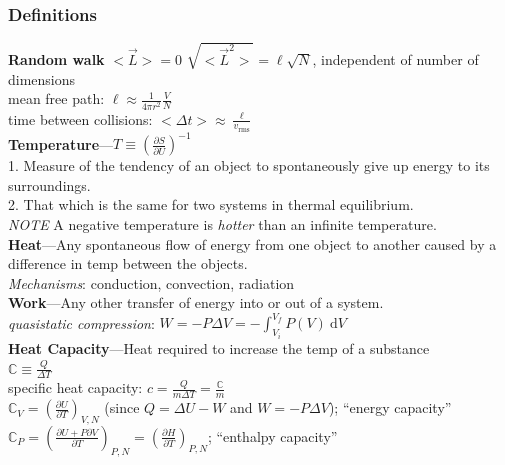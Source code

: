 \documentclass[letterpaper,landscape,10pt]{article}
\begin{document}
{\begin{multicols}{4}
  \subsubsection*{Definitions}
  \textbf{Random walk} $<\vec{L}>=0$ $\sqrt{<\vec{L}^2>}=\ell\sqrt{N}$, independent of number of dimensions \\
  mean free path: $\ell\approx \frac{1}{4\pi r^2}\frac{V}{N}$ \\
  time between collisions: $<\Delta t>\approx \frac{\ell}{v_{\textrm{rms}}}$ \\
    \textbf{Temperature}---$T\equiv \left( \frac{\partial S}{\partial U} \right)^{-1}$\\
    1. Measure of the tendency of an object to spontaneously give up energy to
      its surroundings. \\
    2. That which is the same for two systems in thermal equilibrium. \\
    \emph{NOTE} A negative temperature is \emph{hotter} than an infinite
    temperature. \\
	\vspace{2.5pt}
  \textbf{Heat}---Any spontaneous flow of energy from one object to another
    caused by a difference in temp between the objects. \\
	\emph{Mechanisms}: conduction, convection, radiation \\
	\vspace{2.5pt}
  \textbf{Work}---Any other transfer of energy into or out of a system.\\
    \hspace{5pt}\emph{quasistatic compression}:
    $W=-P\Delta V = -\int_{V_i}^{V_f}P(V)\:\textrm{d}V$ \\
  \vspace{2.5pt}
	\textbf{Heat Capacity}---Heat required to increase the temp of a substance \\
	  \hspace{5pt} $\mathbb{C} \equiv \frac{Q}{\Delta T}$\\
	  \hspace{5pt} specific heat capacity: $c = \frac{Q}{m \Delta T} = \frac{\mathbb{C}}{m}$\\
	  \hspace{5pt} $\mathbb{C}_V = \left( \frac{\partial U}{\partial T} \right)_{V,N}$
	    (since $Q=\Delta U-W$ and $W=-P\Delta V$); ``energy capacity''\\
		\hspace{5pt} $\mathbb{C}_{P} = \left( \frac{\partial U + P\partial V}{\partial T} \right)_{P,N} = \left( \frac{\partial H}{\partial T} \right)_{P,N}$; ``enthalpy capacity''\\

\end{multicols}}
\end{document}
